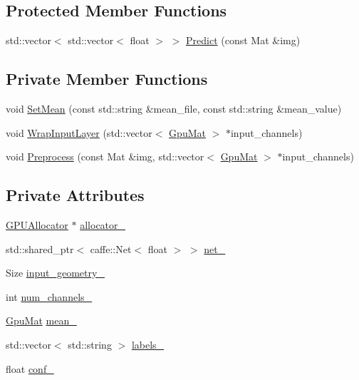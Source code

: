 \subsection*{Protected Member Functions}
\begin{DoxyCompactItemize}
\item 
std\+::vector$<$ std\+::vector$<$ float $>$ $>$ \mbox{\hyperlink{class_s_s_d_a58c0ef81b4b24424fd967d90da5c6045}{Predict}} (const Mat \&img)
\end{DoxyCompactItemize}
\subsection*{Private Member Functions}
\begin{DoxyCompactItemize}
\item 
void \mbox{\hyperlink{class_s_s_d_ada3debdd0e04185587f13b44a6b63765}{Set\+Mean}} (const std\+::string \&mean\+\_\+file, const std\+::string \&mean\+\_\+value)
\item 
void \mbox{\hyperlink{class_s_s_d_aec550d5312257216d93955cdee13a73e}{Wrap\+Input\+Layer}} (std\+::vector$<$ \mbox{\hyperlink{gpu__allocator_8h_aa7700da124206551c0f9d273152f13fb}{Gpu\+Mat}} $>$ $\ast$input\+\_\+channels)
\item 
void \mbox{\hyperlink{class_s_s_d_a83cb8c64cda9b3792c5612613b56c828}{Preprocess}} (const Mat \&img, std\+::vector$<$ \mbox{\hyperlink{gpu__allocator_8h_aa7700da124206551c0f9d273152f13fb}{Gpu\+Mat}} $>$ $\ast$input\+\_\+channels)
\end{DoxyCompactItemize}
\subsection*{Private Attributes}
\begin{DoxyCompactItemize}
\item 
\mbox{\hyperlink{class_g_p_u_allocator}{G\+P\+U\+Allocator}} $\ast$ \mbox{\hyperlink{class_s_s_d_af45a3ca33b8adcb4b2e23ebd23891947}{allocator\+\_\+}}
\item 
std\+::shared\+\_\+ptr$<$ caffe\+::\+Net$<$ float $>$ $>$ \mbox{\hyperlink{class_s_s_d_a9b70501b85252c3135030e5c6c1e7117}{net\+\_\+}}
\item 
Size \mbox{\hyperlink{class_s_s_d_a3fe828551a5a53a3f43a481ae5d2d96a}{input\+\_\+geometry\+\_\+}}
\item 
int \mbox{\hyperlink{class_s_s_d_affe6f7e948b0040bd958db34758d8ab1}{num\+\_\+channels\+\_\+}}
\item 
\mbox{\hyperlink{gpu__allocator_8h_aa7700da124206551c0f9d273152f13fb}{Gpu\+Mat}} \mbox{\hyperlink{class_s_s_d_a3974a4a620cee93f5523c459482887e2}{mean\+\_\+}}
\item 
std\+::vector$<$ std\+::string $>$ \mbox{\hyperlink{class_s_s_d_a1c4d34f2dda5d4ca2dfabbebff7a0ddb}{labels\+\_\+}}
\item 
float \mbox{\hyperlink{class_s_s_d_a2deab37585140ff74fbec6e54f5407bf}{conf\+\_\+}}
\end{DoxyCompactItemize}


